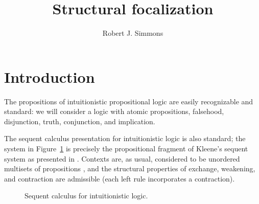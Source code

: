 \documentclass[acmtocl]{robtrans}\pdfoutput=1
\title{Structural focalization}
\author{Robert J. Simmons}
\begin{document}
\maketitle




\section{Introduction}

The propositions of intuitionistic propositional logic are easily recognizable
and standard: we will consider a logic with atomic propositions, 
falsehood, disjunction, truth, conjunction, and implication.

The sequent calculus presentation for intuitionistic logic is also standard;
the system in 
Figure~\ref{fig:unfoc} is precisely the propositional fragment of 
Kleene's sequent system  as presented in \cite{pfenning00structural}.
Contexts  are, as usual, considered to be
unordered multisets of propositions , and the structural properties
of exchange, weakening, and contraction are admissible (each left
rule incorporates a contraction).

\begin{figure}
\fbox{}






\caption{Sequent calculus for intuitionistic logic.}
\label{fig:unfoc}
\end{figure}
\end{document}
